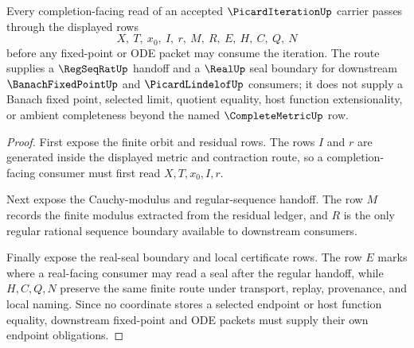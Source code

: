 \begin{theorem}
\label{thm:picard-iteration-completion-handoff}
Every completion-facing read of an accepted $\PicardIterationUp$ carrier passes through the displayed rows
$$
X,\ T,\ x_0,\ I,\ r,\ M,\ R,\ E,\ H,\ C,\ Q,\ N
$$
before any fixed-point or ODE packet may consume the iteration. The route supplies a $\RegSeqRatUp$ handoff and a $\RealUp$ seal boundary for downstream $\BanachFixedPointUp$ and $\PicardLindelofUp$ consumers; it does not supply a Banach fixed point, selected limit, quotient equality, host function extensionality, or ambient completeness beyond the named $\CompleteMetricUp$ row.
\end{theorem}
\begin{proof}
First expose the finite orbit and residual rows. The rows $I$ and $r$ are generated inside the displayed metric and contraction route, so a completion-facing consumer must first read $X,T,x_0,I,r$.

Next expose the Cauchy-modulus and regular-sequence handoff. The row $M$ records the finite modulus extracted from the residual ledger, and $R$ is the only regular rational sequence boundary available to downstream consumers.

Finally expose the real-seal boundary and local certificate rows. The row $E$ marks where a real-facing consumer may read a seal after the regular handoff, while $H,C,Q,N$ preserve the same finite route under transport, replay, provenance, and local naming. Since no coordinate stores a selected endpoint or host function equality, downstream fixed-point and ODE packets must supply their own endpoint obligations.
\end{proof}


